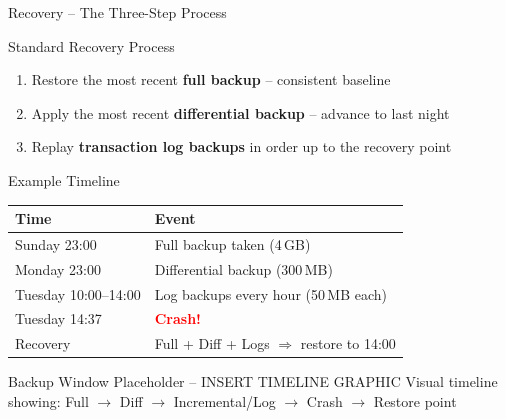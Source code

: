 \begin{frame}{Recovery -- The Three-Step Process}
  \begin{block}{Standard Recovery Process}
    \begin{enumerate}
      \item Restore the most recent \textbf{full backup} -- consistent baseline
      \item Apply the most recent \textbf{differential backup} -- advance to last night
      \item Replay \textbf{transaction log backups} in order up to the recovery point
    \end{enumerate}
  \end{block}

  \begin{block}{Example Timeline}
    \begin{tabular}{@{}ll@{}}
      \toprule
      \textbf{Time} & \textbf{Event} \\
      \midrule
      Sunday 23:00  & Full backup taken (4\,GB) \\
      Monday 23:00  & Differential backup (300\,MB) \\
      Tuesday 10:00--14:00 & Log backups every hour (50\,MB each) \\
      Tuesday 14:37 & \textcolor{red}{\textbf{Crash!}} \\
      Recovery & Full + Diff + Logs $\Rightarrow$ restore to 14:00 \\
      \bottomrule
    \end{tabular}
  \end{block}

  \begin{alertblock}{Backup Window Placeholder -- INSERT TIMELINE GRAPHIC}
    Visual timeline showing: Full $\to$ Diff $\to$ Incremental/Log $\to$ Crash $\to$ Restore point
  \end{alertblock}
\end{frame}

